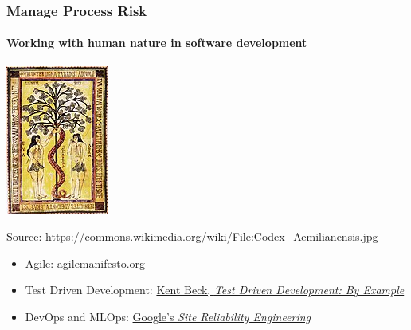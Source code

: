 \begin{frame}
    \frametitle{Manage Process Risk}
    \framesubtitle{Working with human nature in software development}
    \begin{center}
        \includegraphics[height=0.35\textheight]{graphics/Codex_Aemilianensis}
        \end{center}
        Source: \url{https://commons.wikimedia.org/wiki/File:Codex_Aemilianensis.jpg}
    \begin{itemize}
    \item Agile: \href{https://agilemanifesto.org/}{agilemanifesto.org}
    \item Test Driven Development: \href{https://www.oreilly.com/library/view/test-driven-development/0321146530/}{Kent Beck, {\it Test Driven Development: By Example}}
    \item DevOps and MLOps: \href{https://landing.google.com/sre/books/}{Google's {\it Site Reliability Engineering}}
    \end{itemize}
\end{frame}

